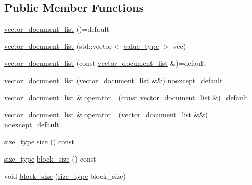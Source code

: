\subsection*{Public Member Functions}
\begin{DoxyCompactItemize}
\item 
\mbox{\hyperlink{classirk_1_1vector__document__list_a765120ad7cc8fe813666aa223c7055f0}{vector\+\_\+document\+\_\+list}} ()=default
\item 
\mbox{\hyperlink{classirk_1_1vector__document__list_aee7fc8d2b55075dca80eb883fe5cd0dc}{vector\+\_\+document\+\_\+list}} (std\+::vector$<$ \mbox{\hyperlink{classirk_1_1vector__document__list_a0ec9c56f5e12a3a9101b5a18b2fbe69f}{value\+\_\+type}} $>$ vec)
\item 
\mbox{\hyperlink{classirk_1_1vector__document__list_a9cf59196d2d41f1c83d018aa8891cb80}{vector\+\_\+document\+\_\+list}} (const \mbox{\hyperlink{classirk_1_1vector__document__list}{vector\+\_\+document\+\_\+list}} \&)=default
\item 
\mbox{\hyperlink{classirk_1_1vector__document__list_a5560538fbf6e6087623cdff8f1bb4452}{vector\+\_\+document\+\_\+list}} (\mbox{\hyperlink{classirk_1_1vector__document__list}{vector\+\_\+document\+\_\+list}} \&\&) noexcept=default
\item 
\mbox{\hyperlink{classirk_1_1vector__document__list}{vector\+\_\+document\+\_\+list}} \& \mbox{\hyperlink{classirk_1_1vector__document__list_a5e609af5fd334a30b4d66b78d4972ecb}{operator=}} (const \mbox{\hyperlink{classirk_1_1vector__document__list}{vector\+\_\+document\+\_\+list}} \&)=default
\item 
\mbox{\hyperlink{classirk_1_1vector__document__list}{vector\+\_\+document\+\_\+list}} \& \mbox{\hyperlink{classirk_1_1vector__document__list_ace71e19d37f8c9d179b8e922893381d8}{operator=}} (\mbox{\hyperlink{classirk_1_1vector__document__list}{vector\+\_\+document\+\_\+list}} \&\&) noexcept=default
\item 
\mbox{\hyperlink{classirk_1_1vector__document__list_ac9387bd9f5dc89b638b6295858a9268c}{size\+\_\+type}} \mbox{\hyperlink{classirk_1_1vector__document__list_ad7eac494d9c0aa784efaa1a4faa47616}{size}} () const
\item 
\mbox{\hyperlink{classirk_1_1vector__document__list_ac9387bd9f5dc89b638b6295858a9268c}{size\+\_\+type}} \mbox{\hyperlink{classirk_1_1vector__document__list_ae6a0a3b41d660778ab8dae0e432a47b1}{block\+\_\+size}} () const
\item 
void \mbox{\hyperlink{classirk_1_1vector__document__list_a1e835fe551a310ba89749812b2e9ea1f}{block\+\_\+size}} (\mbox{\hyperlink{classirk_1_1vector__document__list_ac9387bd9f5dc89b638b6295858a9268c}{size\+\_\+type}} block\+\_\+size)

\end{DoxyCompactItemize}
